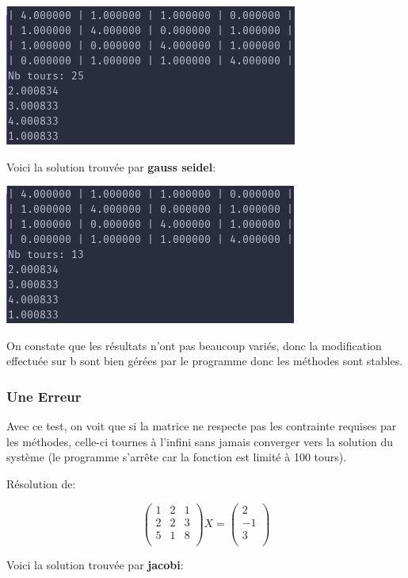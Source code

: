 \documentclass[a4paper]{article}
\begin{document}
\includegraphics[scale=0.5]{./img/jacobi/jac_ex_1_mod.png}

Voici la solution trouvée par \textbf{gauss seidel}:

\includegraphics[scale=0.5]{./img/gauss_seidel/g_e_ex_1_mod.png}

On constate que les résultats n'ont pas beaucoup variés, donc la modification
effectuée sur b sont bien gérées par le programme donc les méthodes sont stables.

\subsubsection{Une Erreur}

Avec ce test, on voit que si la matrice ne respecte pas les contrainte requises
par les méthodes, celle-ci tournes à l'infini sans jamais converger vers la
solution du système (le programme s'arrête car la fonction est limité à 100 tours).

Résolution de:

\[
\begin{pmatrix}
  1 & 2 & 1\\
  2 & 2 & 3\\
  5 & 1 & 8\\
\end{pmatrix} X =
\begin{pmatrix}
  2\\
  -1\\
  3\\
\end{pmatrix}
\]

Voici la solution trouvée par \textbf{jacobi}:
\end{document}
